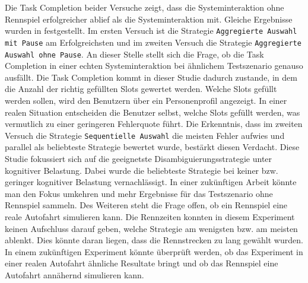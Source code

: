 \documentclass[12pt,a4paper]{scrartcl}
\begin{document}
Die Task Completion beider Versuche zeigt, dass die Systeminteraktion ohne Rennspiel erfolgreicher ablief als die Systeminteraktion mit. Gleiche Ergebnisse wurden in \cite{eCLDS} festgestellt. Im ersten Versuch ist die Strategie \texttt{Aggregierte Auswahl mit Pause} am Erfolgreichsten und im zweiten Versuch die Strategie \texttt{Aggregierte Auswahl ohne Pause}. An dieser Stelle stellt sich die Frage, ob die Task Completion in einer echten Systeminteraktion bei ähnlichem Testszenario genauso ausfällt. Die Task Completion kommt in dieser Studie dadurch zustande, in dem die Anzahl der richtig gefüllten Slots gewertet werden. Welche Slots gefüllt werden sollen, wird den Benutzern über ein Personenprofil angezeigt. In einer realen Situation entscheiden die Benutzer selbst, welche Slots gefüllt werden, was vermutlich zu einer geringeren Fehlerquote führt. Die Erkenntnis, dass im zweiten Versuch die Strategie \texttt{Sequentielle Auswahl} die meisten Fehler aufwies und parallel als beliebteste Strategie bewertet wurde, bestärkt diesen Verdacht. 
\newline
\newline
Diese Studie fokussiert sich auf die geeignetste Disambiguierungsstrategie unter kognitiver Belastung. Dabei wurde die beliebteste Strategie bei keiner bzw. geringer kognitiver Belastung vernachlässigt. In einer zukünftigen Arbeit könnte man den Fokus umkehren und mehr Ergebnisse für das Testszenario ohne Rennspiel sammeln. 
Des Weiteren steht die Frage offen, ob ein Rennspiel eine reale Autofahrt simulieren kann. Die Rennzeiten konnten in diesem Experiment keinen Aufschluss darauf geben, welche Strategie am wenigsten bzw. am meisten ablenkt. Dies könnte daran liegen, dass die Rennstrecken zu lang gewählt wurden. In einem zukünftigen Experiment könnte überprüft werden, ob das Experiment in einer realen Autofahrt ähnliche Resultate bringt und ob das Rennspiel eine Autofahrt annähernd simulieren kann.
\end{document}
